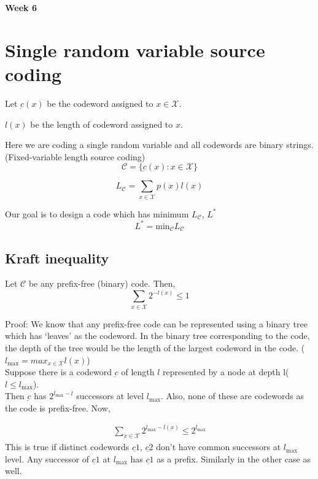 \documentclass{article}
\begin{document}
\begin{center}
\textbf{\huge{Week 6}}
\end{center}

\section{Single random variable source coding}

Let $\underbar{c}(x)$ be the codeword assigned to $x \in \mathcal{X}$.

$l(x)$ be the length of codeword assigned to $x$.

Here we are coding a single random variable and all codewords are binary strings. (Fixed-variable length source coding)
$$ \mathscr{C}= \{ \underbar{c}(x): x \in \mathcal{X}\}$$

$$ L_{\mathscr{C}}= \sum_{x \in \mathcal{X}}p(x)l(x)$$

Our goal is to design a code which has minimum $L_{\mathscr{C}}$, $L^{*}$
$$L^{*} = \text{min}_{\mathscr{C}} L_{\mathscr{C}}$$

\subsection{Kraft inequality}

Let $\mathscr{C}$ be any prefix-free (binary) code. Then,
$$ \sum_{x \in \mathcal{X}} 2^{-l(x)} \leq 1$$

Proof: We know that any prefix-free code can be represented using a binary tree which has `leaves' as the codeword. In the binary tree corresponding to the code, the depth of the tree would be the length of the largest codeword in the code. ($l_{\text{max}}=max_{x \in \mathcal{X}} l(x)$)\\

Suppose there is a codeword $\underbar{c}$ of length $l$ represented by a node at depth l($l \leq l_{\text{max}}$).\\

Then $\underbar{c}$ has $2^{l_{\text{max}}-l}$ successors at level $l_{\text{max}}$. Also, none of these are codewords as the code is prefix-free. Now,

\begin{align}
    \sum_{\underbar{x} \in \mathcal{X}} 2^{l_{\text{max}}-l(\underbar{x})} \leq 2^{l_{\text{max}}}
\end{align}
This is true if distinct codewords $\underbar{c1}$, $\underbar{c2}$ don't have common successors at $l_{\text{max}}$ level. Any successor of $\underbar{c1}$ at $l_{\text{max}}$ has $\underbar{c1}$ as a prefix. Similarly in the other case as well.
\end{document}
